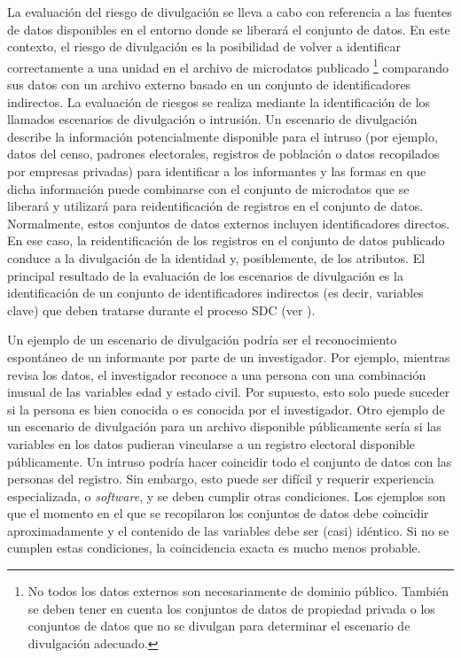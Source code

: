 \documentclass[]{book}
\theoremstyle{definition}
\theoremstyle{definition}
\theoremstyle{definition}
\theoremstyle{definition}
\theoremstyle{remark}
\begin{document}
La evaluación del riesgo de divulgación se lleva a cabo con referencia a las fuentes de datos disponibles en el entorno donde se liberará el conjunto de datos. En este contexto, el riesgo de divulgación es la posibilidad de volver a identificar correctamente a una unidad en el archivo de microdatos publicado \footnote{No todos los datos externos son necesariamente de dominio público. También se deben tener en cuenta los conjuntos de datos de propiedad privada o los conjuntos de datos que no se divulgan para determinar el escenario de divulgación adecuado.} comparando sus datos con un archivo externo basado en un conjunto de identificadores indirectos. La evaluación de riesgos se realiza mediante la identificación de los llamados escenarios de divulgación o intrusión. Un escenario de divulgación describe la información potencialmente disponible para el intruso (por ejemplo, datos del censo, padrones electorales, registros de población o datos recopilados por empresas privadas) para identificar a los informantes y las formas en que dicha información puede combinarse con el conjunto de microdatos que se liberará y utilizará para reidentificación de registros en el conjunto de datos. Normalmente, estos conjuntos de datos externos incluyen identificadores directos. En ese caso, la reidentificación de los registros en el conjunto de datos publicado conduce a la divulgación de la identidad y, posiblemente, de los atributos. El principal resultado de la evaluación de los escenarios de divulgación es la identificación de un conjunto de identificadores indirectos (es decir, variables clave) que deben tratarse durante el proceso SDC (ver \citet{elliot2010}).

Un ejemplo de un escenario de divulgación podría ser el reconocimiento espontáneo de un informante por parte de un investigador. Por ejemplo, mientras revisa los datos, el investigador reconoce a una persona con una combinación inusual de las variables edad y estado civil. Por supuesto, esto solo puede suceder si la persona es bien conocida o es conocida por el investigador. Otro ejemplo de un escenario de divulgación para un archivo disponible públicamente sería si las variables en los datos pudieran vincularse a un registro electoral disponible públicamente. Un intruso podría hacer coincidir todo el conjunto de datos con las personas del registro. Sin embargo, esto puede ser difícil y requerir experiencia especializada, o \emph{software}, y se deben cumplir otras condiciones. Los ejemplos son que el momento en el que se recopilaron los conjuntos de datos debe coincidir aproximadamente y el contenido de las variables debe ser (casi) idéntico. Si no se cumplen estas condiciones, la coincidencia exacta es mucho menos probable.
\end{document}
